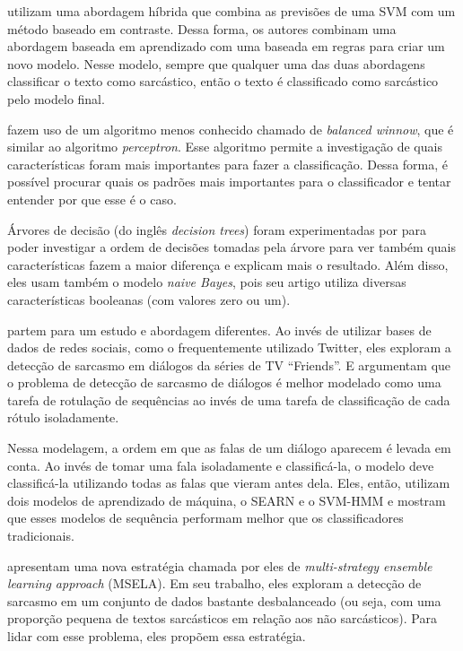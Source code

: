 \cite{riloff:2013:sarcasm-constract} utilizam uma abordagem híbrida que combina
as previsões de uma SVM com um método baseado em contraste. Dessa forma, os
autores combinam uma abordagem baseada em aprendizado com uma baseada em regras
para criar um novo modelo. Nesse modelo, sempre que qualquer uma das duas
abordagens classificar o texto como sarcástico, então o texto é classificado
como sarcástico pelo modelo final.

\cite{liebrecht:2013:perfect-solution} fazem uso de um algoritmo menos conhecido
chamado de \textit{balanced winnow}, que é similar ao algoritmo
\textit{perceptron}. Esse algoritmo permite a investigação de quais
características foram mais importantes para fazer a classificação.  Dessa forma,
é possível procurar quais os padrões mais importantes para o classificador e
tentar entender por que esse é o caso.

Árvores de decisão (do inglês \textit{decision trees}) foram experimentadas por
\cite{reyes:2013:multidimensional-approach} para poder investigar a ordem de
decisões tomadas pela árvore para ver também quais características fazem a maior
diferença e explicam mais o resultado. Além disso, eles usam também o modelo
\textit{naive Bayes}, pois seu artigo utiliza diversas características booleanas
(com valores zero ou um).

\cite{joshi-etal:2016:harnessing} partem para um estudo e abordagem diferentes.
Ao invés de utilizar bases de dados de redes sociais, como o frequentemente
utilizado Twitter, eles exploram a detecção de sarcasmo em diálogos da séries de
TV ``Friends''. E argumentam que o problema de detecção de sarcasmo de diálogos
é melhor modelado como uma tarefa de rotulação de sequências ao invés de uma
tarefa de classificação de cada rótulo isoladamente.

Nessa modelagem, a ordem em que as falas de um diálogo aparecem é levada em
conta. Ao invés de tomar uma fala isoladamente e classificá-la, o modelo deve
classificá-la utilizando todas as falas que vieram antes dela. Eles, então,
utilizam dois modelos de aprendizado de máquina, o SEARN e o SVM-HMM e mostram
que esses modelos de sequência performam melhor que os classificadores
tradicionais.

\cite{liu-etal:2014:imbalanced-classification} apresentam uma nova estratégia
chamada por eles de \textit{multi-strategy ensemble learning approach} (MSELA).
Em seu trabalho, eles exploram a detecção de sarcasmo em um conjunto de dados
bastante desbalanceado (ou seja, com uma proporção pequena de textos sarcásticos
em relação aos não sarcásticos). Para lidar com esse problema, eles propõem essa
estratégia.

